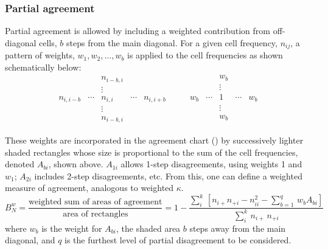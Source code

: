 \subsubsection{Partial agreement}
 Partial agreement is allowed by
including a weighted contribution from off-diagonal cells, $b$
steps from the main diagonal.  For a given cell frequency,
$n_{ij}$, a pattern of weights, $w_1, w_2, \dots,  w_b$ is applied
to the cell frequencies
as shown schematically below:
\begin{equation*}
 \left.
 \begin{array}{ccccc}
   &  & n_{i-b,i} &  & \\
        &  & \vdots    &  & \\
        n_{i, i-b} & \cdots & n_{i, i} & \cdots & n_{i, i+b} \\
        &  & \vdots    &  & \\
   &  & n_{i-b,i} &  &
 \end{array}
  \right.
  \qquad
 \left.
 \begin{array}{ccccc}
   &  & w_b &  & \\
   &  & \vdots &  & \\
 w_b & \cdots & 1 & \cdots & w_b \\
   &  & \vdots &  & \\
   &  & w_b &  & \\
 \end{array}
  \right.
\end{equation*}

These weights are incorporated in the agreement chart () by successively lighter
shaded rectangles whose size is proportional to the sum of the cell
frequencies, denoted \(A_{bi}\), shown above.  \(A_{1i}\)
allows 1-step disagreements, using weights 1 and $w_1$;
\(A_{2i}\) includes 2-step disagreements,
etc.  From this, one can define a weighted measure of agreement,
analogous to weighted \(\kappa\).
\begin{equation*}
  B_N^w  =
  \frac{ \mbox{weighted sum of areas of agreement}}
  { \mbox{area of rectangles} }  =
  1 - \frac{ \sum_i^k \,
  [ n_{i+} n_{+i} - n_{ii}^2  -
  \sum_{b=1}^q \,  w_b  A_{bi} ] }
  { \sum_i^k \,  n_{i+} \,  n_{+i} }
\end{equation*}
where \(w_b\) is the weight for \(A_{bi}\), the shaded area $b$ steps
away from the main diagonal, and $q$ is the furthest level of partial
disagreement to be considered.

